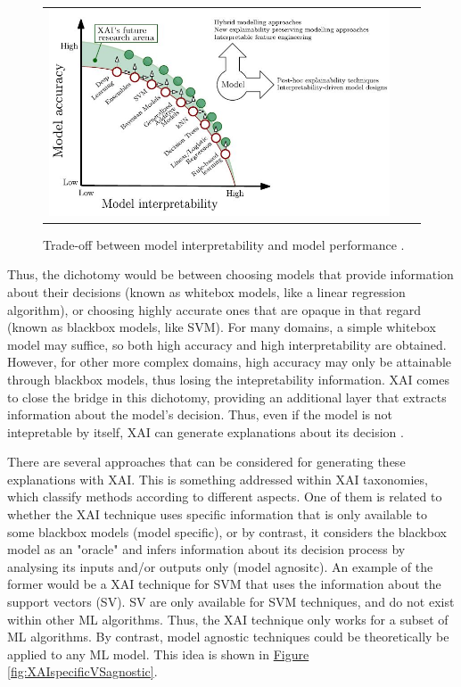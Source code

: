 \begin{figure}[h!]
\centering
 \begin{tabular}{c@{\qquad}c@{\qquad}c}
\includegraphics[width=0.8\columnwidth]{figures/XAI_tradeoff.jpg}
  \end{tabular} 
  \caption{Trade-off between model interpretability and model performance \parencite{arrieta2020explainable}.\label{fig:XAItradeoff}}
\end{figure}

Thus, the dichotomy would be between choosing models that provide information about their decisions (known as whitebox models, like a linear regression algorithm), or choosing highly accurate ones that are opaque in that regard (known as blackbox models, like SVM). For many domains, a simple whitebox model may suffice, so both high accuracy and high interpretability are obtained. However, for other more complex domains, high accuracy may only be attainable through blackbox models, thus losing the intepretability information. XAI comes to close the bridge in this dichotomy, providing an additional layer that extracts information about the model's decision. Thus, even if the model is not intepretable by itself, XAI can generate explanations about its decision \parencite{arrieta2020explainable}. 

There are several approaches that can be considered for generating these explanations with XAI. This is something addressed within XAI taxonomies, which classify methods according to different aspects. One of them is related to whether the XAI technique uses specific information that is only available to some blackbox models (model specific), or by contrast, it considers the blackbox model as an "oracle" and infers information about its decision process by analysing its inputs and/or outputs only (model agnositc). An example of the former would be a XAI technique for SVM that uses the information about the support vectors (SV). SV are only available for SVM techniques, and do not exist within other ML algorithms. Thus, the XAI technique only works for a subset of ML algorithms. By contrast, model agnostic techniques could be theoretically be applied to any ML model. This idea is shown in \hyperref[fig:XAIspecificVSagnostic]{Figure} \ref{fig:XAIspecificVSagnostic}.
 
